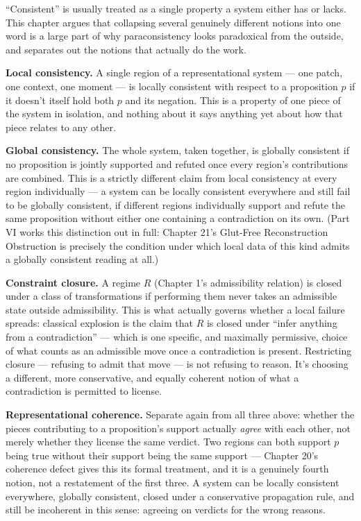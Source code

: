 ``Consistent'' is usually treated as a single property a system either has
or lacks. This chapter argues that collapsing several genuinely different
notions into one word is a large part of why paraconsistency looks
paradoxical from the outside, and separates out the notions that actually
do the work.

\textbf{Local consistency.} A single region of a representational system ---
one patch, one context, one moment --- is locally consistent with respect
to a proposition \(p\) if it doesn't itself hold both \(p\) and its negation.
This is a property of one piece of the system in isolation, and nothing
about it says anything yet about how that piece relates to any other.

\textbf{Global consistency.} The whole system, taken together, is globally
consistent if no proposition is jointly supported and refuted once every
region's contributions are combined. This is a strictly different claim
from local consistency at every region individually --- a system can be
locally consistent everywhere and still fail to be globally consistent,
if different regions individually support and refute the same
proposition without either one containing a contradiction on its own.
(Part VI works this distinction out in full: Chapter 21's Glut-Free
Reconstruction Obstruction is precisely the condition under which local
data of this kind admits a globally consistent reading at all.)

\textbf{Constraint closure.} A regime \(R\) (Chapter 1's admissibility relation)
is closed under a class of transformations if performing them never
takes an admissible state outside admissibility. This is what actually
governs whether a local failure spreads: classical explosion is the
claim that \(R\) is closed under ``infer anything from a contradiction'' ---
which is one specific, and maximally permissive, choice of what counts
as an admissible move once a contradiction is present. Restricting
closure --- refusing to admit that move --- is not refusing to reason. It's
choosing a different, more conservative, and equally coherent notion of
what a contradiction is permitted to license.

\textbf{Representational coherence.} Separate again from all three above:
whether the pieces contributing to a proposition's support actually
\emph{agree} with each other, not merely whether they license the same
verdict. Two regions can both support \(p\) being true without their
support being the same support --- Chapter 20's coherence defect gives this
its formal treatment, and it is a genuinely fourth notion, not a
restatement of the first three. A system can be locally consistent
everywhere, globally consistent, closed under a conservative propagation
rule, and still be incoherent in this sense: agreeing on verdicts for the
wrong reasons.

